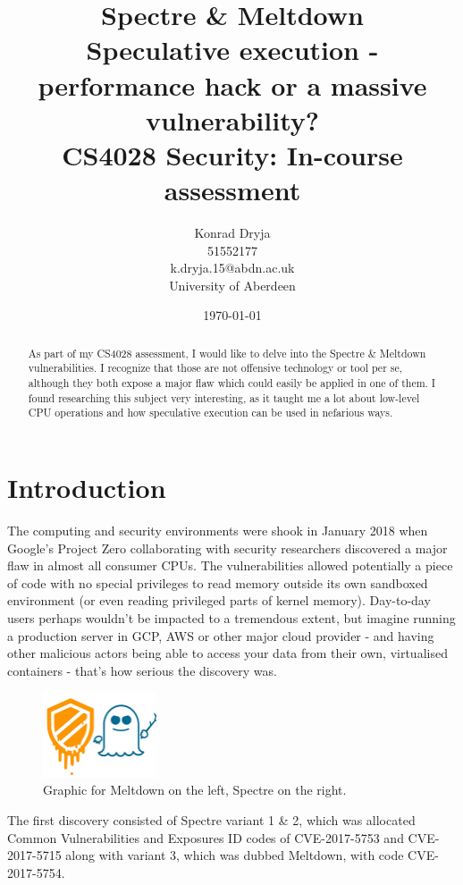 \documentclass{article}
\title{Spectre \& Meltdown \\
\large{Speculative execution - performance hack or a massive vulnerability? \\ CS4028 Security: In-course assessment}}
\author{Konrad Dryja \\ 51552177 \\ k.dryja.15@abdn.ac.uk \\ University of Aberdeen}
\date{\today}
\begin{document}
 
\maketitle
 
\tableofcontents

\begin{abstract}
  As part of my CS4028 assessment, I would like to delve into the Spectre \& Meltdown vulnerabilities. I recognize that those are not offensive technology or tool per se, although they both expose a major flaw which could easily be applied in one of them. I found researching this subject very interesting, as it taught me a lot about low-level CPU operations and how speculative execution can be used in nefarious ways. 
\end{abstract}
 
\section{Introduction}
 
The computing and security environments were shook in January 2018 when Google's Project Zero collaborating with security researchers discovered a major flaw in almost all consumer CPUs. The vulnerabilities allowed potentially a piece of code with no special privileges to read memory outside its own sandboxed environment (or even reading privileged parts of kernel memory). Day-to-day users perhaps wouldn't be impacted to a tremendous extent, but imagine running a production server in GCP, AWS or other major cloud provider - and having other malicious actors being able to access your data from their own, virtualised containers - that's how serious the discovery was. 

\begin{figure}[h]
\centering
\includegraphics[width=0.3\textwidth]{logo}
  \caption{Graphic for Meltdown on the left, Spectre on the right.}
\end{figure}

The first discovery consisted of Spectre variant 1 \& 2, which was allocated Common Vulnerabilities and Exposures ID codes of CVE-2017-5753 and CVE-2017-5715 along with variant 3, which was dubbed Meltdown, with code CVE-2017-5754.
 
\end{document}
